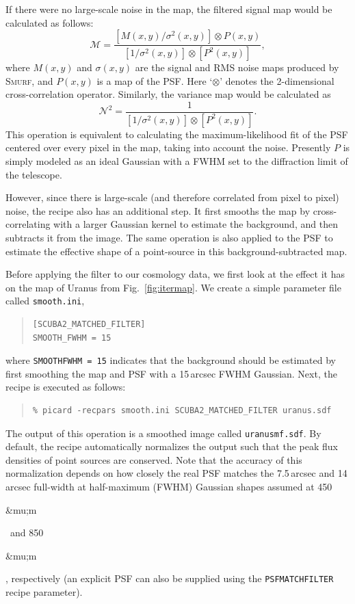 \documentclass[twoside,11pt]{article}
\newcommand{\micron}{\mbox{\,${\umu}$m}}            %
\newcommand{\xref}[3]{#1}
\renewcommand{\_}{\texttt{\symbol{95}}}
\newenvironment{myquote}{\begin{quote}\begin{small}}{\end{small}\end{quote}}
\newcommand{\smurf}{\xref{\textsc{Smurf}}{sun258}{}}
\newcommand{\param}[1]{\texttt{#1}}
\renewcommand{\micron}{\begin{rawhtml}&mu;m\end{rawhtml}}
\begin{document}
If there were no large-scale noise in the map, the filtered signal map
would be calculated as follows:
%
\begin{equation}
\mathcal{M} = \frac{[M(x,y)/\sigma^2(x,y)] \otimes P(x,y)}
  {[1/\sigma^2(x,y)] \otimes [P^2(x,y)]},
\end{equation}
%
where $M(x,y)$ and $\sigma(x,y)$ are the signal and RMS
noise maps produced by \smurf, and $P(x,y)$ is a map of the
PSF. Here `$\otimes$' denotes the 2-dimensional cross-correlation
operator. Similarly, the variance map would be calculated as
%
\begin{equation}
  \mathcal{N}^2 = \frac{1}{[1/\sigma^2(x,y)] \otimes [P^2(x,y)]}.
\end{equation}
%
This operation is equivalent to calculating the maximum-likelihood fit
of the PSF centered over every pixel in the map, taking into account
the noise. Presently $P$ is simply modeled as an ideal Gaussian
with a FWHM set to the diffraction limit of the telescope.

However, since there is large-scale (and therefore correlated from
pixel to pixel) noise, the recipe also has an additional step. It
first smooths the map by cross-correlating with a larger Gaussian
kernel to estimate the background, and then subtracts it from the
image. The same operation is also applied to the PSF to estimate the
effective shape of a point-source in this background-subtracted map.

Before applying the filter to our cosmology data, we first look at the
effect it has on the map of Uranus from Fig.~\ref{fig:itermap}. We
create a simple parameter file called \texttt{smooth.ini},
\begin{myquote}
\begin{verbatim}
[SCUBA2_MATCHED_FILTER]
SMOOTH_FWHM = 15
\end{verbatim}
\end{myquote}
%
where \texttt{SMOOTH\_FWHM = 15} indicates that the background should
be estimated by first smoothing the map and PSF with a 15\,arcsec FWHM
Gaussian. Next, the recipe is executed as follows:
%
\begin{myquote}
\begin{verbatim}
% picard -recpars smooth.ini SCUBA2_MATCHED_FILTER uranus.sdf
\end{verbatim}
\end{myquote}
%
The output of this operation is a smoothed image called
\texttt{uranus\_mf.sdf}. By default, the recipe automatically
normalizes the output such that the peak flux densities of point
sources are conserved. Note that the accuracy of this normalization
depends on how closely the real PSF matches the 7.5\,arcsec and
14\,arcsec full-width at half-maximum (FWHM) Gaussian shapes assumed
at 450\micron\ and 850\micron, respectively (an explicit PSF can
also be supplied using the \param{PSF\_MATCHFILTER} recipe
parameter).
\end{document}
